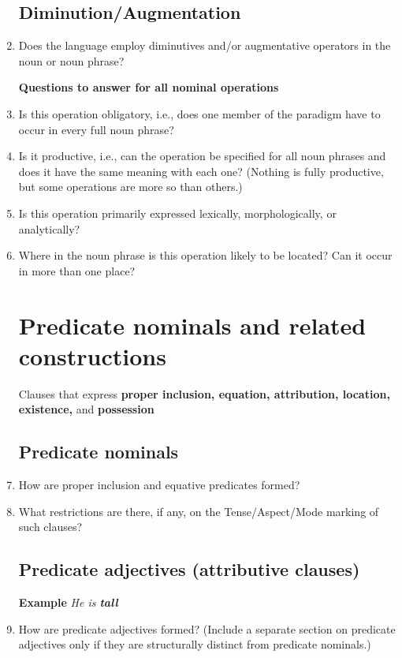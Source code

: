 \documentclass[twocolumn]{scrartcl}
\newcommand{\productive}{(Nothing is fully productive, but some operations are more so than others.)}
\begin{document}
\begin{enumerate}[resume]
\subsection{Diminution/Augmentation}
\item Does the language employ diminutives and/or augmentative operators in the noun or noun phrase?

\textbf{Questions to answer for all nominal operations}
\item Is this operation obligatory, i.e., does one member of the paradigm have to occur in every full noun phrase?
\item Is it productive, i.e., can the operation be specified for all noun phrases and does it have the same meaning with each one? \productive
\item Is this operation primarily expressed lexically, morphologically, or analytically?
\item Where in the noun phrase is this operation likely to be located? Can it occur in more than one place?
\section{Predicate nominals and related constructions}
Clauses that express \textbf{proper inclusion, equation, attribution, location, existence,} and \textbf{possession}
\subsection{Predicate nominals}

\item How are proper inclusion and equative predicates formed?
\color{black}
\item What restrictions are there, if any, on the Tense/Aspect/Mode marking of such clauses?
\subsection{Predicate adjectives (attributive clauses)}
\textbf{Example} \textit{He is \textbf{tall}}
\item How are predicate adjectives formed? (Include a separate section on predicate adjectives only if they are structurally distinct from predicate nominals.)

\end{enumerate}
\end{document}
